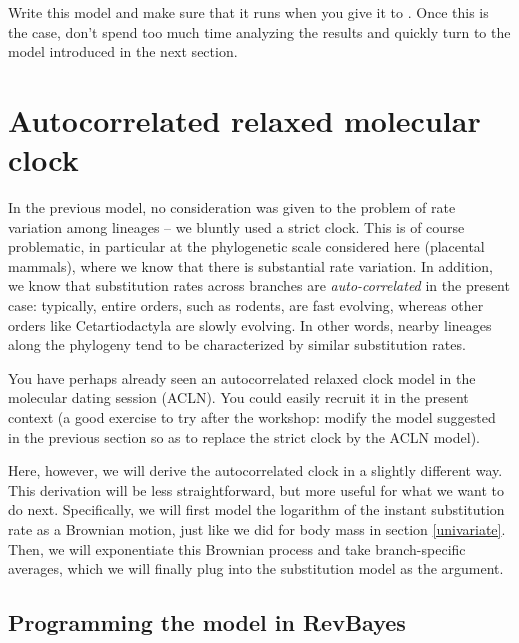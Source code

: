 Write this model and make sure that it runs when you give it to . Once this is the case, don't spend too much time analyzing the results and quickly turn to the model introduced in the next section.

\section{Autocorrelated relaxed molecular clock}

In the previous model, no consideration was given to the problem of rate variation among lineages --
we bluntly used a strict clock. This is of course problematic, in particular at the phylogenetic scale considered here (placental mammals), where we know that there is substantial rate variation. In addition, we know that substitution rates across branches are \emph{auto-correlated} in the present case: typically, entire orders, such as rodents, are fast evolving, whereas other orders like Cetartiodactyla are slowly evolving. In other words, nearby lineages along the phylogeny tend to be characterized by similar substitution rates.

You have perhaps already seen an autocorrelated relaxed clock model in the molecular dating session (ACLN). You could easily recruit it in the present context (a good exercise to try after the workshop: modify the model suggested in the previous section so as to replace the strict clock by the ACLN model).

Here, however, we will derive the autocorrelated clock in a slightly different way. This derivation will be less straightforward, but more useful for what we want to do next.
Specifically, we will first model the logarithm of the instant substitution rate as a Brownian motion, just like we did for body mass in section \ref{univariate}. Then, we will exponentiate this Brownian process and take branch-specific averages, which we will finally plug into the substitution model as the  argument.

\subsection{Programming the model in RevBayes}

